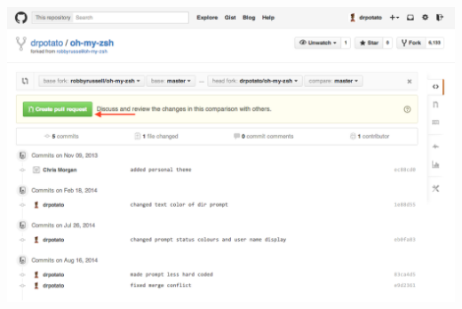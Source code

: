 \documentclass{tufte-handout}
\begin{document}
\includegraphics[scale=0.4]{img/github-finish-pull-request.png}
\end{document}

